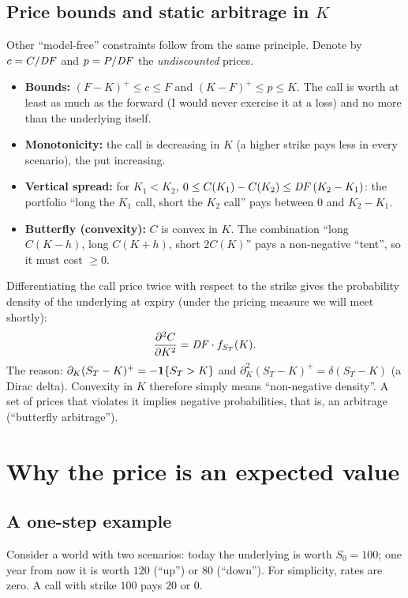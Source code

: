 \subsection{Price bounds and static arbitrage in \texorpdfstring{$K$}{K}}
Other ``model-free'' constraints follow from the same principle. Denote by $c=C/\mathit{DF}$ and $p=P/\mathit{DF}$ the
\emph{undiscounted} prices.
\begin{itemize}
\item \textbf{Bounds:} $(F-K)^+\le c\le F$ and $(K-F)^+\le p\le K$. The call is worth at least as much as the forward
(I would never exercise it at a loss) and no more than the underlying itself.
\item \textbf{Monotonicity:} the call is decreasing in $K$ (a higher strike pays less in every scenario), the put
increasing.
\item \textbf{Vertical spread:} for $K_1<K_2$, $0\le C(K_1)-C(K_2)\le\mathit{DF}\,(K_2-K_1)$: the portfolio ``long the $K_1$
call, short the $K_2$ call'' pays between $0$ and $K_2-K_1$.
\item \textbf{Butterfly (convexity):} $C$ is convex in $K$. The combination ``long $C(K-h)$, long $C(K+h)$, short
$2C(K)$'' pays a non-negative ``tent'', so it must cost $\ge0$.
\end{itemize}

\begin{idea}[title={Key idea: from prices to the density (Breeden--Litzenberger)}]
Differentiating the call price twice with respect to the strike gives the probability density of the underlying at
expiry (under the pricing measure we will meet shortly):
\begin{equation}\label{eq:breeden}
\frac{\partial^2 C}{\partial K^2}=\mathit{DF}\cdot f_{S_T}(K).
\end{equation}
The reason: $\partial_K(S_T-K)^+=-\mathbf{1}\{S_T>K\}$ and $\partial_K^2(S_T-K)^+=\delta(S_T-K)$ (a Dirac delta). Convexity
in $K$ therefore simply means ``non-negative density''. A set of prices that violates it implies negative
probabilities, that is, an arbitrage (``butterfly arbitrage'').
\end{idea}

\section{Why the price is an expected value}

\subsection{A one-step example}
Consider a world with two scenarios: today the underlying is worth $S_0=100$; one year from now it is worth $120$
(``up'') or $80$ (``down''). For simplicity, rates are zero. A call with strike $100$ pays $20$ or $0$.

